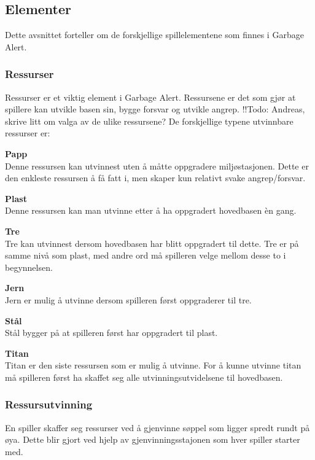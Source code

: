 

\subsection{Elementer}
Dette avsnittet forteller om de forskjellige spillelementene som finnes
i Garbage Alert.
\subsubsection{Ressurser}
Ressurser er et viktig element i Garbage Alert. Ressursene er det som
gjør at spillere kan utvikle basen sin, bygge forsvar og utvikle angrep.
!!Todo: Andreas, skrive litt om valga av de ulike ressursene?
De forskjellige typene utvinnbare ressurser er:
\begin{description}
	\item \textbf{Papp}\\ Denne ressursen kan utvinnest uten å måtte
oppgradere miljøstasjonen. Dette er den enkleste ressursen å få fatt i,
men skaper kun relativt svake angrep/forsvar.
	\item \textbf{Plast}\\ Denne ressursen kan man utvinne etter å ha
oppgradert hovedbasen èn gang.
	\item \textbf{Tre}\\ Tre kan utvinnest dersom hovedbasen har blitt
oppgradert til dette. Tre er på samme nivå som plast, med andre ord må
spilleren velge mellom desse to i begynnelsen.
	\item \textbf{Jern}\\ Jern er mulig å utvinne dersom spilleren først
oppgraderer til tre.
	\item \textbf{Stål}\\ Stål bygger på at spilleren først har
oppgradert til plast.
	\item \textbf{Titan}\\ Titan er den siste ressursen som er mulig å
utvinne. For å kunne utvinne titan må spilleren først ha skaffet seg
alle utvinningsutvidelsene til hovedbasen.
\end{description}
\subsubsection{Ressursutvinning}
En spiller skaffer seg ressurser ved å gjenvinne søppel som ligger
spredt rundt på øya. Dette blir gjort ved hjelp av gjenvinningsstajonen
som hver spiller starter med.
